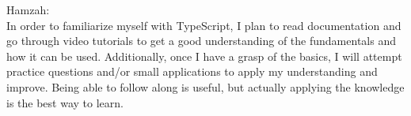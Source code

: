 \documentclass[12pt,letterpaper]{article}
\begin{document}
\begin{enumerate}
Hamzah: \\

In order to familiarize myself with TypeScript, I plan to read documentation and go through video tutorials to get a good understanding of the fundamentals and how it can be used. Additionally, once I have a grasp of the basics, I will attempt practice questions and/or small applications to apply my understanding and improve. Being able to follow along is useful, but actually applying the knowledge is the best way to learn. 
\\

\end{enumerate}
\end{document}
